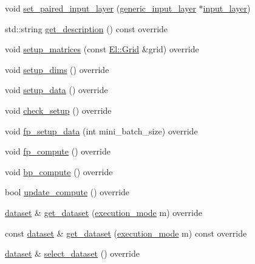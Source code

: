\begin{DoxyCompactItemize}
void \hyperlink{classlbann_1_1generic__target__layer_ab1bf1a639db82f2dd6ef3994f2269ec2}{set\+\_\+paired\+\_\+input\+\_\+layer} (\hyperlink{classlbann_1_1generic__input__layer}{generic\+\_\+input\+\_\+layer} $\ast$\hyperlink{classlbann_1_1input__layer}{input\+\_\+layer})
\item 
std\+::string \hyperlink{classlbann_1_1generic__target__layer_aa2db5ccc0bbd40f081c8ff4501f3fc29}{get\+\_\+description} () const override
\item 
void \hyperlink{classlbann_1_1generic__target__layer_af8bcdbd313c9793187fe6e53396e3356}{setup\+\_\+matrices} (const \hyperlink{base_8hpp_a9951bb1719d534e0401b1f06cad19eab}{El\+::\+Grid} \&grid) override
\item 
void \hyperlink{classlbann_1_1generic__target__layer_a3a970c1b23f7367276f7061563fc8b65}{setup\+\_\+dims} () override
\item 
void \hyperlink{classlbann_1_1generic__target__layer_a73b35ee4dcb97a166369426d975596b2}{setup\+\_\+data} () override
\item 
void \hyperlink{classlbann_1_1generic__target__layer_a35375f4cf914ba5a308fdbd98c589408}{check\+\_\+setup} () override
\item 
void \hyperlink{classlbann_1_1generic__target__layer_af89a8227784c005354bf937ec887a7ed}{fp\+\_\+setup\+\_\+data} (int mini\+\_\+batch\+\_\+size) override
\item 
void \hyperlink{classlbann_1_1generic__target__layer_a57a60f5a28c9fb78d5151801123d4dba}{fp\+\_\+compute} () override
\item 
void \hyperlink{classlbann_1_1generic__target__layer_ab29b31c81b115acd7e01de25ef190b99}{bp\+\_\+compute} () override
\item 
bool \hyperlink{classlbann_1_1generic__target__layer_a43f4de7c1846b605aa9bb6daf9338c78}{update\+\_\+compute} () override
\item 
\hyperlink{classlbann_1_1dataset}{dataset} \& \hyperlink{classlbann_1_1generic__target__layer_af2a0f4313863a029263efd0fced40571}{get\+\_\+dataset} (\hyperlink{base_8hpp_a2781a159088df64ed7d47cc91c4dc0a8}{execution\+\_\+mode} m) override
\item 
const \hyperlink{classlbann_1_1dataset}{dataset} \& \hyperlink{classlbann_1_1generic__target__layer_a76569f34b5af75d6b822fb3349f7406f}{get\+\_\+dataset} (\hyperlink{base_8hpp_a2781a159088df64ed7d47cc91c4dc0a8}{execution\+\_\+mode} m) const override
\item 
\hyperlink{classlbann_1_1dataset}{dataset} \& \hyperlink{classlbann_1_1generic__target__layer_a0008630554477f39ad5ec950bf803876}{select\+\_\+dataset} () override

\end{DoxyCompactItemize}
